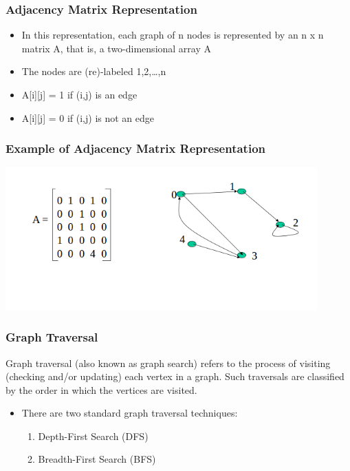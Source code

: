 \documentclass{beamer}
\begin{document}
\begin{frame}
\frametitle{Adjacency Matrix Representation}
\begin{itemize}
\item In this representation, each graph of n nodes is represented by an n x n matrix A, that is, a two-dimensional array A
\item The nodes are (re)-labeled 1,2,…,n
\item A[i][j] = 1 if (i,j) is an edge
\item A[i][j] = 0 if (i,j) is not an edge
\end{itemize}
\end{frame}
\begin{frame}
\frametitle{Example of Adjacency Matrix Representation}

\includegraphics[width = 12cm]{mat2}
\end{frame}
\begin{frame}
\frametitle{Graph Traversal}
Graph traversal (also known as graph search) refers to the process of visiting (checking and/or updating) each vertex in a graph. Such traversals are classified by the order in which the vertices are visited.\\
\begin{itemize}
\item There are two standard graph traversal techniques:\\
\begin{enumerate}
\item Depth-First Search (DFS)
\item Breadth-First Search (BFS)
\end{enumerate}
\end{itemize}
\end{frame}
\end{document}
